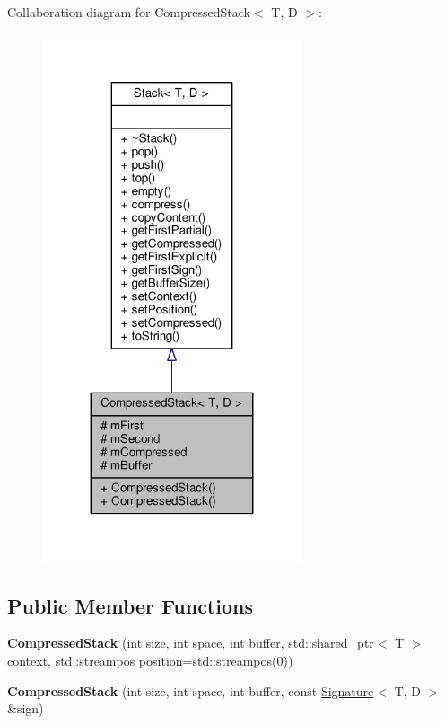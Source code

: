 Collaboration diagram for Compressed\+Stack$<$ T, D $>$\+:
\nopagebreak
\begin{figure}[H]
\begin{center}
\leavevmode
\includegraphics[width=215pt]{class_compressed_stack__coll__graph}
\end{center}
\end{figure}
\subsection*{Public Member Functions}
\begin{DoxyCompactItemize}
\item 
{\bfseries Compressed\+Stack} (int size, int space, int buffer, std\+::shared\+\_\+ptr$<$ T $>$ context, std\+::streampos position=std\+::streampos(0))\hypertarget{class_compressed_stack_adbfd81811e7061deccacbbe2ec1709ec}{}\label{class_compressed_stack_adbfd81811e7061deccacbbe2ec1709ec}

\item 
{\bfseries Compressed\+Stack} (int size, int space, int buffer, const \hyperlink{class_signature}{Signature}$<$ T, D $>$ \&sign)\hypertarget{class_compressed_stack_aa51942713c62d541ddcce32e433642e4}{}\label{class_compressed_stack_aa51942713c62d541ddcce32e433642e4}

\end{DoxyCompactItemize}
